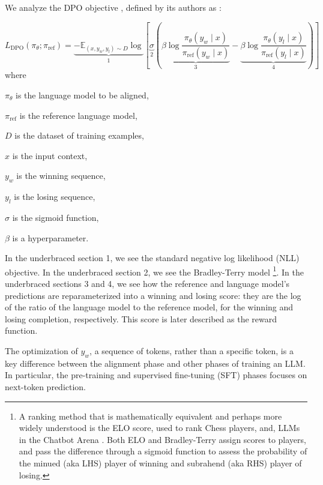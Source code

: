 \documentclass[twoside,11pt]{article}
\begin{document}
We analyze the DPO objective \cite[Eq. 7]{Rafailov},  
defined by its authors as :

\begin{equation}
  \label{eq:dpo}
  L_\mathrm{DPO}(\pi_\theta; \pi_\mathrm{ref}) =
  \underbrace{
  -\mathbb{E}_{(x, y_w, y_l) \sim D} 
  \log }_{1} 
  \left[ 
    \underbrace{\sigma }_{2}
    \left(
    \underbrace{\beta \log \frac{\pi_\theta(y_w \mid x)}{\pi_\mathrm{ref}(y_w \mid x)}}_{3}
    - \underbrace{\beta \log \frac{\pi_\theta(y_l \mid x)}{\pi_\mathrm{ref}(y_l \mid x)}}_{4} 
    \right)
  \right]
\end{equation}
where
\begin{description}
  \item $\pi_\theta$ is the language model to be aligned,
  \item $\pi_\mathrm{ref}$ is the reference language model,
  \item $D$ is the dataset of training examples,
  \item $x$ is the input context,
  \item $y_w$ is the winning sequence,
  \item $y_l$ is the losing sequence,
  \item $\sigma$ is the sigmoid function,
  \item $\beta$ is a hyperparameter.
\end{description}

In the underbraced section 1, we see the standard 
negative log likelihood (NLL) objective.
In the underbraced section 2, we see the Bradley-Terry model 
\footnote{A ranking method that is mathematically equivalent and perhaps more 
widely understood is the ELO score, used to rank Chess players, 
and, LLMs in the Chatbot Arena \citep{elo1978rating,chiang2024chatbot}. 
Both ELO and Bradley-Terry assign scores to players, and 
pass the difference through a sigmoid function to assess the probability of 
the minued (aka LHS) player of winning and subrahend (aka RHS) player of losing.}.
In the underbraced sections 3 and 4, we see how the 
reference and language model's predictions are reparameterized
into a winning and losing score: they are the 
log of the ratio of the language model to the reference model, for the winning and 
losing completion, respectively. 
This score is later described as the reward function.

The optimization of $y_w$, a sequence of tokens, rather than
a specific token, is a key difference between the alignment phase and
other phases of training an LLM. In particular, the 
pre-training and supervised fine-tuning (SFT) phases 
focuses on next-token prediction. 
\end{document}
